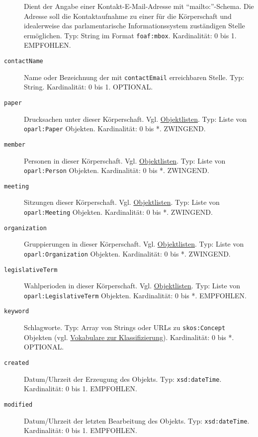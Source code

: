 \documentclass[,a4paper]{article}
\begin{document}
\begin{description}
Dient der Angabe einer Kontakt-E-Mail-Adresse mit ``mailto:''-Schema.
Die Adresse soll die Kontaktaufnahme zu einer für die Körperschaft und
idealerweise das parlamentarische Informationssystem zuständigen Stelle
ermöglichen. Typ: String im Format \texttt{foaf:mbox}. Kardinalität: 0
bis 1. EMPFOHLEN.
\item[\texttt{contactName}]
Name oder Bezeichnung der mit \texttt{contactEmail} erreichbaren Stelle.
Typ: String. Kardinalität: 0 bis 1. OPTIONAL.
\item[\texttt{paper}]
Drucksachen unter dieser Körperschaft. Vgl.
\hyperref[objektlisten]{Objektlisten}. Typ: Liste von
\texttt{oparl:Paper} Objekten. Kardinalität: 0 bis *. ZWINGEND.
\item[\texttt{member}]
Personen in dieser Körperschaft. Vgl.
\hyperref[objektlisten]{Objektlisten}. Typ: Liste von
\texttt{oparl:Person} Objekten. Kardinalität: 0 bis *. ZWINGEND.
\item[\texttt{meeting}]
Sitzungen dieser Körperschaft. Vgl.
\hyperref[objektlisten]{Objektlisten}. Typ: Liste von
\texttt{oparl:Meeting} Objekten. Kardinalität: 0 bis *. ZWINGEND.
\item[\texttt{organization}]
Gruppierungen in dieser Körperschaft. Vgl.
\hyperref[objektlisten]{Objektlisten}. Typ: Liste von
\texttt{oparl:Organization} Objekten. Kardinalität: 0 bis *. ZWINGEND.
\item[\texttt{legislativeTerm}]
Wahlperioden in dieser Körperschaft. Vgl.
\hyperref[objektlisten]{Objektlisten}. Typ: Liste von
\texttt{oparl:LegislativeTerm} Objekten. Kardinalität: 0 bis *.
EMPFOHLEN.
\item[\texttt{keyword}]
Schlagworte. Typ: Array von Strings oder URLs zu \texttt{skos:Concept}
Objekten (vgl. \hyperref[vokabulareux5fklassifizierung]{Vokabulare zur
Klassifizierung}). Kardinalität: 0 bis *. OPTIONAL.
\item[\texttt{created}]
Datum/Uhrzeit der Erzeugung des Objekts. Typ: \texttt{xsd:dateTime}.
Kardinalität: 0 bis 1. EMPFOHLEN.
\item[\texttt{modified}]
Datum/Uhrzeit der letzten Bearbeitung des Objekts. Typ:
\texttt{xsd:dateTime}. Kardinalität: 0 bis 1. EMPFOHLEN.
\end{description}

\end{document}
